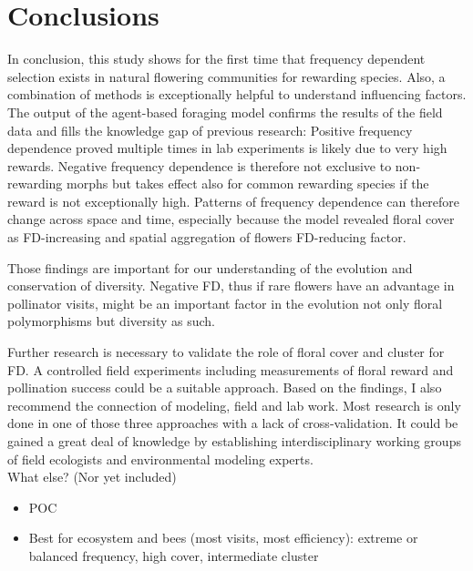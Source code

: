 \section{Conclusions}
\label{ch:conclusions}
In conclusion, this study shows for the first time that frequency dependent selection exists in natural flowering communities for rewarding species. Also, a combination of methods is exceptionally helpful to understand influencing factors. The output of the agent-based foraging model confirms the results of the field data and fills the knowledge gap of previous research: Positive frequency dependence proved multiple times in lab experiments is likely due to very high rewards. Negative frequency dependence is therefore not exclusive to non-rewarding morphs but takes effect also for common rewarding species if the reward is not exceptionally high. Patterns of frequency dependence can therefore change across space and time, especially because the model revealed floral cover as FD-increasing and spatial aggregation of flowers FD-reducing factor.

Those findings are important for our understanding of the evolution and conservation of diversity. Negative FD, thus if rare flowers have an advantage in pollinator visits, might be an important factor in the evolution not only floral polymorphisms but diversity as such. 

Further research is necessary to validate the role of floral cover and cluster for FD. A controlled field experiments including measurements of floral reward and pollination success could be a suitable approach. Based on the findings, I also recommend the connection of modeling, field and lab work. Most research is only done in one of those three approaches with a lack of cross-validation. It could be gained a great deal of knowledge by establishing interdisciplinary working groups of field ecologists and environmental modeling experts. \\


What else? (Nor yet included)
\begin{itemize}
	\item POC
	\item Best for ecosystem and bees (most visits, most efficiency): extreme or balanced frequency, high cover, intermediate cluster
\end{itemize}
